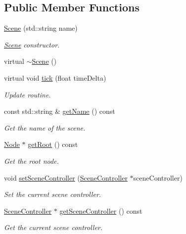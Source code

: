 \subsection*{Public Member Functions}
\begin{DoxyCompactItemize}
\item 
\mbox{\hyperlink{classec_1_1_scene_a9abac0a0de42ff4e9eb6481cf1927754}{Scene}} (std\+::string name)
\begin{DoxyCompactList}\small\item\em \mbox{\hyperlink{classec_1_1_scene}{Scene}} constructor. \end{DoxyCompactList}\item 
virtual \mbox{\hyperlink{classec_1_1_scene_a25e849d1bd5a9a71af922c3668115cb6}{$\sim$\+Scene}} ()
\item 
virtual void \mbox{\hyperlink{classec_1_1_scene_a09deb945a2c8255d70a68b0aaddaecb6}{tick}} (float time\+Delta)
\begin{DoxyCompactList}\small\item\em Update routine. \end{DoxyCompactList}\item 
const std\+::string \& \mbox{\hyperlink{classec_1_1_scene_a24c00d38f3b17123f10f02ff77830f62}{get\+Name}} () const
\begin{DoxyCompactList}\small\item\em Get the name of the scene. \end{DoxyCompactList}\item 
\mbox{\hyperlink{classec_1_1_node}{Node}} $\ast$ \mbox{\hyperlink{classec_1_1_scene_aef77276f4a386c5b66159ecb1d4d072c}{get\+Root}} () const
\begin{DoxyCompactList}\small\item\em Get the root node. \end{DoxyCompactList}\item 
void \mbox{\hyperlink{classec_1_1_scene_a8c3bc6848957704f9f45508c13133a91}{set\+Scene\+Controller}} (\mbox{\hyperlink{classec_1_1_scene_controller}{Scene\+Controller}} $\ast$scene\+Controller)
\begin{DoxyCompactList}\small\item\em Set the current scene controller. \end{DoxyCompactList}\item 
\mbox{\hyperlink{classec_1_1_scene_controller}{Scene\+Controller}} $\ast$ \mbox{\hyperlink{classec_1_1_scene_ad562a16db4552e529af7284de0b79304}{get\+Scene\+Controller}} () const
\begin{DoxyCompactList}\small\item\em Get the current scene controller. \end{DoxyCompactList}\item 

\end{DoxyCompactItemize}
